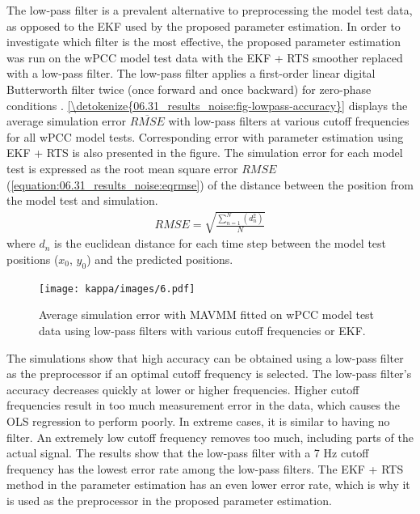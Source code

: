 The low-pass filter is a prevalent alternative to preprocessing the model test data, as opposed to the EKF used by the proposed parameter estimation.
In order to investigate which filter is the most effective, the proposed parameter estimation was run on the wPCC model test data with the EKF + RTS smoother replaced with a low-pass filter. The low-pass filter applies a first-order linear digital Butterworth filter twice (once forward and once backward) for zero-phase conditions \cite{virtanen_scipy_2020}. \hyperref[\detokenize{06.31_results_noise:fig-lowpass-accuracy}]{\autoref{\detokenize{06.31_results_noise:fig-lowpass-accuracy}}} displays the average simulation error \( \overline{RMSE} \) with low-pass filters at various cutoff frequencies for all wPCC model tests. Corresponding error with parameter estimation using EKF + RTS is also presented in the figure. The simulation error for each model test is expressed as the root mean square error \(RMSE\) (\autoref{equation:06.31_results_noise:eqrmse}) of the distance between the position from the model test and simulation.
\begin{equation}\label{equation:06.31_results_noise:eqrmse}
\begin{split}RMSE=\sqrt{ \frac{\sum_{n=1}^{N} (d_n^2) }{N}} \end{split}
\end{equation}
where \(d_n\) is the euclidean distance for each time step between the model test positions (\(x_0\), \(y_0\)) and the predicted positions.
\begin{figure}[h!]
\centering
\texttt{[image: kappa/images/6.pdf]}
\caption{Average simulation error with MAVMM fitted on wPCC model test data using low-pass filters with various cutoff frequencies or EKF.}\label{\detokenize{06.31_results_noise:fig-lowpass-accuracy}}\end{figure} 
\noindent The simulations show that high accuracy can be obtained using a low-pass filter as the preprocessor if an optimal cutoff frequency is selected. The low-pass filter's accuracy decreases quickly at lower or higher frequencies. Higher cutoff frequencies result in too much measurement error in the data, which causes the OLS regression to perform poorly. In extreme cases, it is similar to having no filter. An extremely low cutoff frequency removes too much, including parts of the actual signal. The results show that the low-pass filter with a 7 Hz cutoff frequency has the lowest error rate among the low-pass filters. The EKF + RTS method in the parameter estimation has an even lower error rate, which is why it is used as the preprocessor in the proposed parameter estimation.
